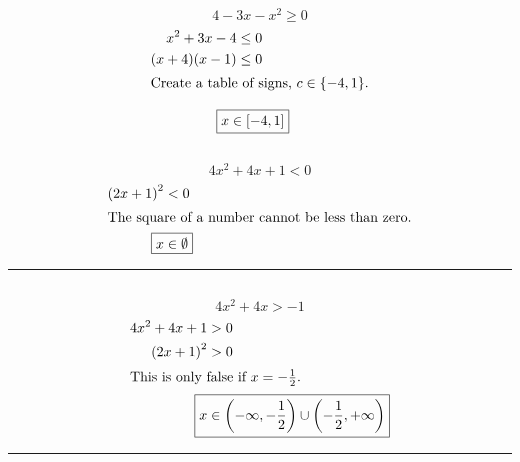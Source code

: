 	\subsection{}
		\[4 - 3x - x^2 \geq 0\]
		\begin{align*}
			x^2 + 3x - 4 &\leq 0 \\
			(x + 4)(x - 1) &\leq 0 \\
			\intertext{Create a table of signs, $c \in \{-4, 1\}$.}
		\end{align*}
		\begin{center}\end{center}
		\begin{align*}
			\Aboxed{x &\in [-4, 1]}
		\end{align*}

	\subsection{}
		\[4x^2 + 4x + 1 < 0\]
		\begin{align*}
			{(2x + 1)}^2 &< 0 \\
			\intertext{The square of a number cannot be less than zero.}
			\Aboxed{x &\in \emptyset}
		\end{align*}
		\hrule{}

	\subsection{}
		\[4x^2 + 4x > -1\]
		\begin{align*}
			4x^2 + 4x + 1 &> 0 \\
			{(2x + 1)}^2 &> 0 \\
			\intertext{This is only false if $x = -\frac{1}{2}$.}
			\Aboxed{x &\in \left(-\infty, -\frac{1}{2}\right) \cup \left(-\frac{1}{2}, +\infty\right)}
		\end{align*}
		\hrule{}

